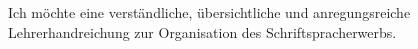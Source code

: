 Ich möchte eine verständliche, übersichtliche und anregungsreiche Lehrerhandreichung zur Organisation des Schriftspracherwerbs.
